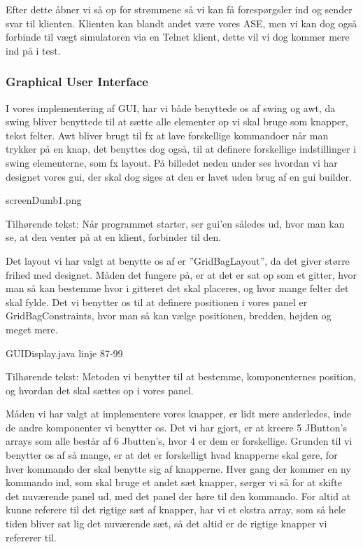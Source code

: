 \documentclass[a4paper]{article}
\begin{document}
Efter dette åbner vi så op for strømmene så vi kan få forespørgsler ind og sender svar til klienten. Klienten kan blandt andet være vores ASE, men vi kan dog også forbinde til vægt simulatoren via en Telnet klient, dette vil vi dog kommer mere ind på i test.


\subsubsection{Graphical User Interface} %

I vores implementering af GUI, har vi både benyttede os af swing og awt, da swing bliver benyttede til at sætte alle elementer op vi skal bruge som knapper, tekst felter. Awt bliver brugt til fx at lave forskellige kommandoer når man trykker på en knap, det benyttes dog også, til at definere forskellige indstillinger i swing elementerne, som fx layout. På billedet neden under ses hvordan vi har designet vores gui, der skal dog siges at den er lavet uden brug af en gui builder.

\begin{center}
screenDumb1.png

Tilhørende tekst: Når programmet starter, ser gui’en således ud, hvor man kan se, at den venter på at en klient, forbinder til den.
\end{center}

Det layout vi har valgt at benytte os af er ”GridBagLayout”, da det giver større frihed med designet. Måden det fungere på, er at det er sat op som et gitter, hvor man så kan bestemme hvor i gitteret det skal placeres, og hvor mange felter det skal fylde. Det vi benytter os til at definere positionen i vores panel er GridBagConstraints, hvor man så kan vælge positionen, bredden, højden og meget mere.

\begin{center}
GUIDisplay.java linje 87-99

Tilhørende tekst: Metoden vi benytter til at bestemme, komponenternes position, og hvordan det skal sættes op i vores panel.
\end{center}

Måden vi har valgt at implementere vores knapper, er lidt mere anderledes, inde de andre komponenter vi benytter os. Det vi har gjort, er at kreere 5 JButton’s arrays som alle består af 6 Jbutten’s, hvor 4 er dem er forskellige. Grunden til vi benytter os af så mange, er at det er forskelligt hvad knapperne skal gøre, for hver kommando der skal benytte sig af knapperne. Hver gang der kommer en ny kommando ind, som skal bruge et andet sæt knapper, sørger vi så for at skifte det nuværende panel ud, med det panel der høre til den kommando. For altid at kunne referere til det rigtige sæt af knapper, har vi et ekstra array, som så hele tiden bliver sat lig det nuværende sæt, så det altid er de rigtige knapper vi refererer til.
\end{document}
